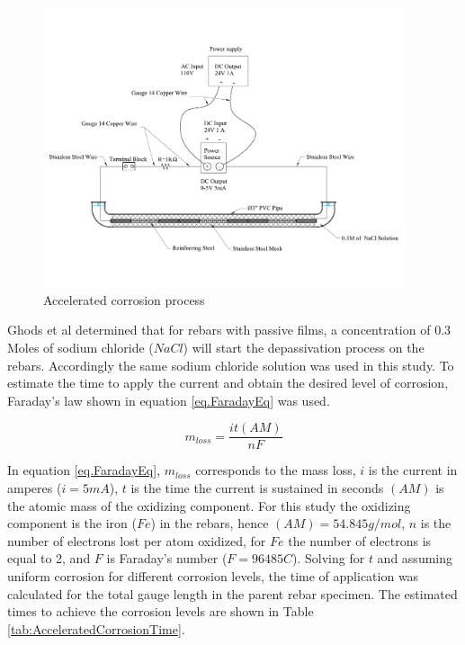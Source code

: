 \begin{figure}[htbp]
	\centering
	\includegraphics[width=0.95\textwidth]{VAC Prelim 2.0/Chapter-3/figs/AcceleratedCorrosionProcedure.pdf}
	\caption{Accelerated corrosion process}
	\label{fig:AcceleratedCorrosion}
\end{figure}

Ghods et al \cite{Ghods2010} determined that for rebars with passive films, a concentration of 0.3 Moles of sodium chloride ($NaCl$) will start the depassivation process on the rebars. Accordingly the same sodium chloride solution was used in this study. To estimate the time to apply the current and obtain the desired level of corrosion,  Faraday's law shown in equation \ref{eq.FaradayEq} was used.

\begin{equation}
	m_{loss}=\frac{it(AM)}{nF}
	\label{eq.FaradayEq}
\end{equation}

 In equation \ref{eq.FaradayEq}, $m_{loss}$ corresponds to the mass loss, $i$ is the current in amperes ($i=5 mA$), $t$ is the time the current is sustained in seconds $(AM)$ is the atomic mass of the oxidizing component. For this study the oxidizing component is the iron ($Fe$) in the rebars, hence $(AM)=54.845g/mol$, $n$ is the number of electrons lost per atom oxidized, for $Fe$ the number of electrons is equal to 2, and $F$ is Faraday's number ($F=96485 C$). Solving  for $t$ and assuming uniform corrosion for different corrosion levels, the time of application was calculated for the total gauge length in the parent rebar specimen. The estimated times to achieve the corrosion levels are shown in Table \ref{tab:AcceleratedCorrosionTime}. 

